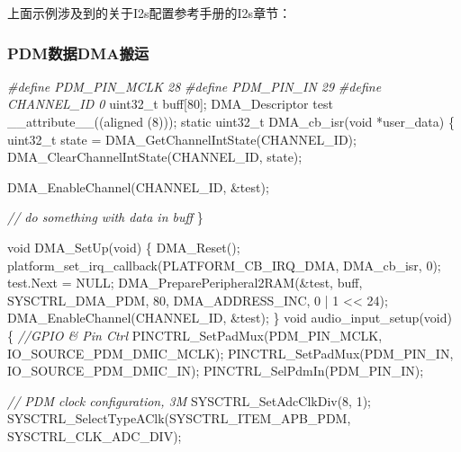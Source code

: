 \documentclass[
  12pt,
]{book}
\newenvironment{Shaded}{\begin{snugshade}}{\end{snugshade}}
\newcommand{\CommentTok}[1]{\textcolor[rgb]{0.56,0.35,0.01}{\textit{#1}}}
\newcommand{\DataTypeTok}[1]{\textcolor[rgb]{0.13,0.29,0.53}{#1}}
\newcommand{\DecValTok}[1]{\textcolor[rgb]{0.00,0.00,0.81}{#1}}
\newcommand{\NormalTok}[1]{#1}
\newcommand{\PreprocessorTok}[1]{\textcolor[rgb]{0.56,0.35,0.01}{\textit{#1}}}
\begin{document}
上面示例涉及到的关于I2s配置参考手册的I2s章节：

\hypertarget{pdmux6570ux636edmaux642cux8fd0}{%
\subsubsection{PDM数据DMA搬运}\label{pdmux6570ux636edmaux642cux8fd0}}

\begin{Shaded}
\begin{Highlighting}[]
\PreprocessorTok{#define PDM_PIN_MCLK        28}
\PreprocessorTok{#define PDM_PIN_IN          29}
\PreprocessorTok{#define CHANNEL_ID  0}
\DataTypeTok{uint32_t}\NormalTok{ buff[}\DecValTok{80}\NormalTok{];}
\NormalTok{DMA_Descriptor test __attribute__((aligned (}\DecValTok{8}\NormalTok{)));}
\DataTypeTok{static} \DataTypeTok{uint32_t}\NormalTok{ DMA_cb_isr(}\DataTypeTok{void}\NormalTok{ *user_data)}
\NormalTok{\{ }
    \DataTypeTok{uint32_t}\NormalTok{ state = DMA_GetChannelIntState(CHANNEL_ID);}
\NormalTok{    DMA_ClearChannelIntState(CHANNEL_ID, state);}

\NormalTok{    DMA_EnableChannel(CHANNEL_ID, &test);}

    \CommentTok{// do something with data in buff}
\NormalTok{\}}

\DataTypeTok{void}\NormalTok{ DMA_SetUp(}\DataTypeTok{void}\NormalTok{)}
\NormalTok{\{}
\NormalTok{    DMA_Reset();}
\NormalTok{    platform_set_irq_callback(PLATFORM_CB_IRQ_DMA, DMA_cb_isr, }\DecValTok{0}\NormalTok{);  }
\NormalTok{    test.Next = NULL;}
\NormalTok{    DMA_PreparePeripheral2RAM(&test, }
\NormalTok{                              buff, }
\NormalTok{                              SYSCTRL_DMA_PDM, }
                              \DecValTok{80}\NormalTok{, }
\NormalTok{                              DMA_ADDRESS_INC, }
                              \DecValTok{0}\NormalTok{ | }\DecValTok{1}\NormalTok{ << }\DecValTok{24}\NormalTok{);}
\NormalTok{    DMA_EnableChannel(CHANNEL_ID, &test);}
\NormalTok{\}}
\DataTypeTok{void}\NormalTok{ audio_input_setup(}\DataTypeTok{void}\NormalTok{)}
\NormalTok{\{}
    \CommentTok{//GPIO & Pin Ctrl}
\NormalTok{    PINCTRL_SetPadMux(PDM_PIN_MCLK, IO_SOURCE_PDM_DMIC_MCLK);}
\NormalTok{    PINCTRL_SetPadMux(PDM_PIN_IN, IO_SOURCE_PDM_DMIC_IN);}
\NormalTok{    PINCTRL_SelPdmIn(PDM_PIN_IN);}

    \CommentTok{// PDM clock configuration, 3M}
\NormalTok{    SYSCTRL_SetAdcClkDiv(}\DecValTok{8}\NormalTok{, }\DecValTok{1}\NormalTok{);}
\NormalTok{    SYSCTRL_SelectTypeAClk(SYSCTRL_ITEM_APB_PDM, SYSCTRL_CLK_ADC_DIV);}
    

\end{Highlighting}
\end{Shaded}
\end{document}

